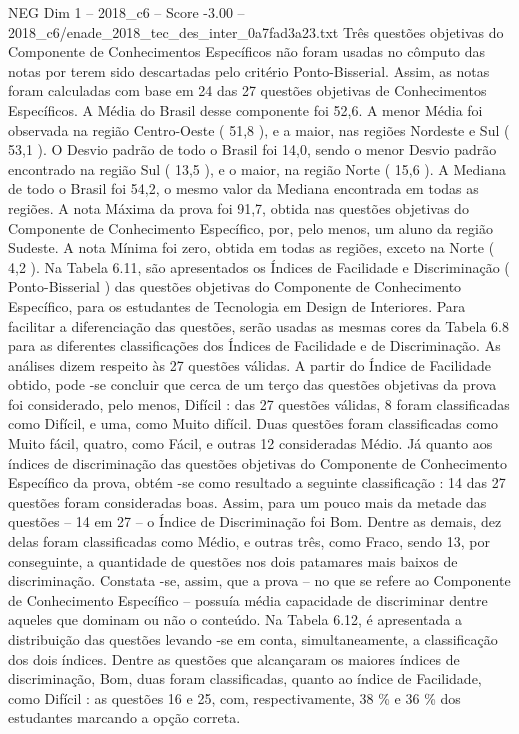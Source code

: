\begin{textsample}{NEG Dim 1 – 2018\_c6 – Score -3.00 – 2018\_c6/enade\_2018\_tec\_des\_inter\_0a7fad3a23.txt}
Três questões objetivas do Componente de Conhecimentos Específicos não foram usadas no cômputo das notas por terem sido descartadas pelo critério Ponto-Bisserial.
Assim, as notas foram calculadas com base em 24 das 27 questões objetivas de Conhecimentos Específicos.
A Média do Brasil desse componente foi 52,6.
A menor Média foi observada na região Centro-Oeste ( 51,8 ), e a maior, nas regiões Nordeste e Sul ( 53,1 ).
O Desvio padrão de todo o Brasil foi 14,0, sendo o menor Desvio padrão encontrado na região Sul ( 13,5 ), e o maior, na região Norte ( 15,6 ).
A Mediana de todo o Brasil foi 54,2, o mesmo valor da Mediana encontrada em todas as regiões.
A nota Máxima da prova foi 91,7, obtida nas questões objetivas do Componente de Conhecimento Específico, por, pelo menos, um aluno da região Sudeste.
A nota Mínima foi zero, obtida em todas as regiões, exceto na Norte ( 4,2 ).
Na Tabela 6.11, são apresentados os Índices de Facilidade e Discriminação ( Ponto-Bisserial ) das questões objetivas do Componente de Conhecimento Específico, para os estudantes de Tecnologia em Design de Interiores.
Para facilitar a diferenciação das questões, serão usadas as mesmas cores da Tabela 6.8 para as diferentes classificações dos Índices de Facilidade e de Discriminação.
As análises dizem respeito às 27 questões válidas.
A partir do Índice de Facilidade obtido, pode -se concluir que cerca de um terço das questões objetivas da prova foi considerado, pelo menos, Difícil : das 27 questões válidas, 8 foram classificadas como Difícil, e uma, como Muito difícil.
Duas questões foram classificadas como Muito fácil, quatro, como Fácil, e outras 12 consideradas Médio.
Já quanto aos índices de discriminação das questões objetivas do Componente de Conhecimento Específico da prova, obtém -se como resultado a seguinte classificação : 14 das 27 questões foram consideradas boas.
Assim, para um pouco mais da metade das questões – 14 em 27 – o Índice de Discriminação foi Bom.
Dentre as demais, dez delas foram classificadas como Médio, e outras três, como Fraco, sendo 13, por conseguinte, a quantidade de questões nos dois patamares mais baixos de discriminação.
Constata -se, assim, que a prova – no que se refere ao Componente de Conhecimento Específico – possuía média capacidade de discriminar dentre aqueles que dominam ou não o conteúdo.
Na Tabela 6.12, é apresentada a distribuição das questões levando -se em conta, simultaneamente, a classificação dos dois índices.
Dentre as questões que alcançaram os maiores índices de discriminação, Bom, duas foram classificadas, quanto ao índice de Facilidade, como Difícil : as questões 16 e 25, com, respectivamente, 38 \% e 36 \% dos estudantes marcando a opção correta.

\end{textsample}
